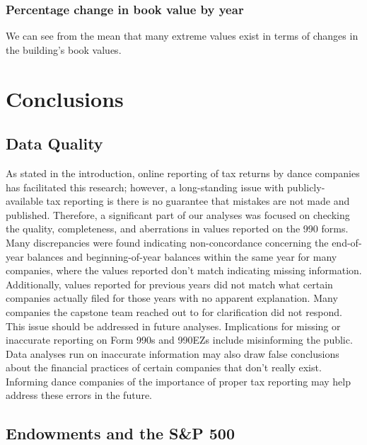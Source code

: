 \documentclass[Dance Data
Project,article,submit,moreauthors,pdftex]{mdpi}
\begin{document}
\hypertarget{percentage-change-in-book-value-by-year}{%
\subsubsection{Percentage change in book value by
year}\label{percentage-change-in-book-value-by-year}}

We can see from the mean that many extreme values exist in terms of
changes in the building's book values.

\hypertarget{conclusions}{%
\section{Conclusions}\label{conclusions}}

\hypertarget{data-quality}{%
\subsection{Data Quality}\label{data-quality}}

As stated in the introduction, online reporting of tax returns by dance
companies has facilitated this research; however, a long-standing issue
with publicly-available tax reporting is there is no guarantee that
mistakes are not made and published. Therefore, a significant part of
our analyses was focused on checking the quality, completeness, and
aberrations in values reported on the 990 forms. Many discrepancies were
found indicating non-concordance concerning the end-of-year balances and
beginning-of-year balances within the same year for many companies,
where the values reported don't match indicating missing information.
Additionally, values reported for previous years did not match what
certain companies actually filed for those years with no apparent
explanation. Many companies the capstone team reached out to for
clarification did not respond. This issue should be addressed in future
analyses. Implications for missing or inaccurate reporting on Form 990s
and 990EZs include misinforming the public. Data analyses run on
inaccurate information may also draw false conclusions about the
financial practices of certain companies that don't really exist.
Informing dance companies of the importance of proper tax reporting may
help address these errors in the future.

\hypertarget{endowments-and-the-sp-500}{%
\subsection{Endowments and the S\&P
500}\label{endowments-and-the-sp-500}}
\end{document}
